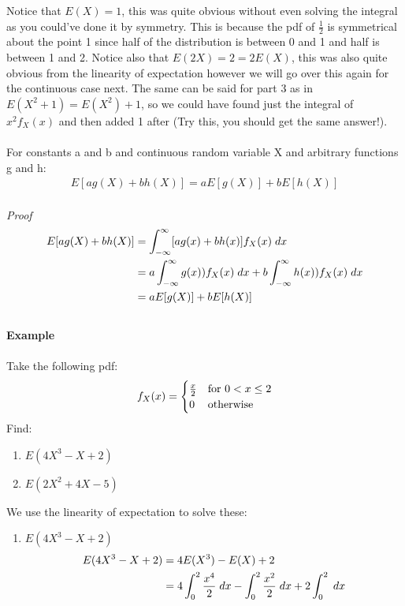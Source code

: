 \documentclass[,oneside]{article}
\begin{document}
\begin{enumerate}
\begin{enumerate}
\end{enumerate}
Notice that $E(X)=1$, this was quite obvious without even solving the integral as you could've done it by symmetry. This is because the pdf of $\frac{1}{2}$ is symmetrical about the point 1 since half of the distribution is between 0 and 1 and half is between 1 and 2. Notice also that $E(2X)=2=2E(X)$, this was also quite obvious from the linearity of expectation however we will go over this again for the continuous case next. The same can be said for part 3 as in $E(X^2+1)=E(X^2)+1$, so we could have found just the integral of $x^2f_X(x)$ and then added 1 after (Try this, you should get the same answer!).\\ \\
For constants a and b and continuous random variable X and arbitrary functions g and h:\\ 
\begin{align*}
E[ag(X)+bh(X)] = aE[g(X)]+bE[h(X)]
\end{align*}\\
\textit{Proof}
\begin{align*}
E[ag(X)+bh(X)] &= \int_{-\infty}^{\infty} [ag(x)+bh(x)]f_X(x)\hspace{0.1cm}dx\\
&=  a\int_{-\infty}^{\infty} g(x))f_X(x)\hspace{0.1cm}dx+b\int_{-\infty}^{\infty} h(x))f_X(x)\hspace{0.1cm}dx\\
&= aE[g(X)]+bE[h(X)]
\end{align*}\\
\textbf{Example}\\ \\
Take the following pdf:
\[
f_X(x)=
\begin{cases}
\frac{x}{2} & \text{for } 0 < x \leq 2 \\
0 & $otherwise$
\end{cases} \] 
Find:
\begin{enumerate}
\item $E(4X^3-X+2)$
\item $E(2X^2+4X-5)$
\end{enumerate}
We use the linearity of expectation to solve these:\\
\begin{enumerate}
\item $E(4X^3-X+2)$
\begin{align*}
 E(4X^3-X+2) &=4E(X^3)-E(X)+2\\
&=  4\int_{0}^{2} \frac{x^4}{2}\hspace{0.1cm}dx-\int_{0}^{2} \frac{x^2}{2}\hspace{0.1cm}dx+2\int_{0}^{2} \hspace{0.1cm}dx\\

\end{align*}
\end{enumerate}
\end{enumerate}
\end{document}
